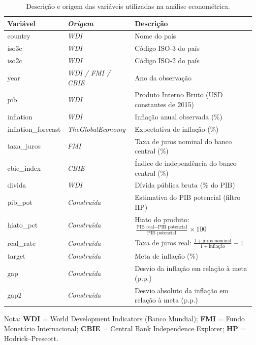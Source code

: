 \documentclass[a4paper,12pt]{article}[abnt2]
\begin{document}
\begin{table}[H]
\centering
\caption{Descrição e origem das variáveis utilizadas na análise econométrica.}
\renewcommand{\arraystretch}{1.3}
\setlength{\tabcolsep}{7pt}
\small
\begin{tabular}{>{\ttfamily}l>{\normalfont\itshape}l>{\normalfont}p{8cm}}
\toprule
\rowcolor[HTML]{F2F5F9}
\textbf{Variável} & \textbf{Origem} & \textbf{Descrição} \\
\midrule
country & WDI & Nome do país \\
\rowcolor[HTML]{F9FBFD}
iso3c & WDI & Código ISO‑3 do país \\
iso2c & WDI & Código ISO‑2 do país \\
\rowcolor[HTML]{F9FBFD}
year & WDI / FMI / CBIE & Ano da observação \\
pib & WDI & Produto Interno Bruto (USD constantes de 2015) \\
\rowcolor[HTML]{F9FBFD}
inflation & WDI & Inflação anual observada (\%) \\
inflation\_forecast & TheGlobalEconomy & Expectativa de inflação (\%) \\
\rowcolor[HTML]{F9FBFD}
taxa\_juros & FMI & Taxa de juros nominal do banco central (\%) \\
cbie\_index & CBIE & Índice de independência do banco central (\%) \\
\rowcolor[HTML]{F9FBFD}
divida & WDI & Dívida pública bruta (\% do PIB) \\
pib\_pot & Construída & Estimativa do PIB potencial (filtro HP) \\
\rowcolor[HTML]{F9FBFD}
hiato\_pct & Construída & Hiato do produto: $\frac{\text{PIB real} - \text{PIB potencial}}{\text{PIB potencial}} \times 100$ \\
\rowcolor[HTML]{F9FBFD}
real\_rate & Construída & Taxa de juros real: $\frac{1 + \text{juros nominal}}{1 + \text{inflação}} - 1$ \\
target & Construída & Meta de inflação (\%) \\
\rowcolor[HTML]{F9FBFD}
gap & Construída & Desvio da inflação em relação à meta (p.p.) \\
gap2 & Construída & Desvio absoluto da inflação em relação à meta (p.p.) \\
\bottomrule
\end{tabular}
\label{tab:base_dados}
\vspace{.1cm}
\footnotesize{
Nota: \textbf{WDI} = World Development Indicators (Banco Mundial); 
\textbf{FMI} = Fundo Monetário Internacional; 
\textbf{CBIE} = Central Bank Independence Explorer; 
\textbf{HP} = Hodrick–Prescott.
}
\end{table}
\end{document}

